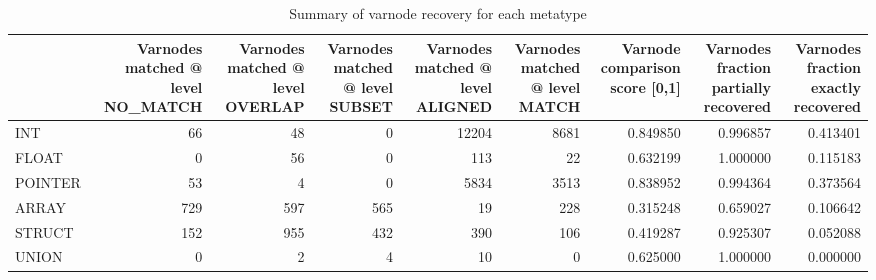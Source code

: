 \begin{table}
\centering
\caption{Summary of varnode recovery for each metatype}
\label{table:metatype-recovery-summary-with-levels}
\begin{tabular}{lrrrrrrrr}
\toprule
{} &  Varnodes matched @ level NO\_MATCH &  Varnodes matched @ level OVERLAP &  Varnodes matched @ level SUBSET &  Varnodes matched @ level ALIGNED &  Varnodes matched @ level MATCH &  Varnode comparison score [0,1] &  Varnodes fraction partially recovered &  Varnodes fraction exactly recovered \\
\midrule
INT     &                                 66 &                                48 &                                0 &                             12204 &                            8681 &                        0.849850 &                               0.996857 &                             0.413401 \\
FLOAT   &                                  0 &                                56 &                                0 &                               113 &                              22 &                        0.632199 &                               1.000000 &                             0.115183 \\
POINTER &                                 53 &                                 4 &                                0 &                              5834 &                            3513 &                        0.838952 &                               0.994364 &                             0.373564 \\
ARRAY   &                                729 &                               597 &                              565 &                                19 &                             228 &                        0.315248 &                               0.659027 &                             0.106642 \\
STRUCT  &                                152 &                               955 &                              432 &                               390 &                             106 &                        0.419287 &                               0.925307 &                             0.052088 \\
UNION   &                                  0 &                                 2 &                                4 &                                10 &                               0 &                        0.625000 &                               1.000000 &                             0.000000 \\
\bottomrule
\end{tabular}
\end{table}
